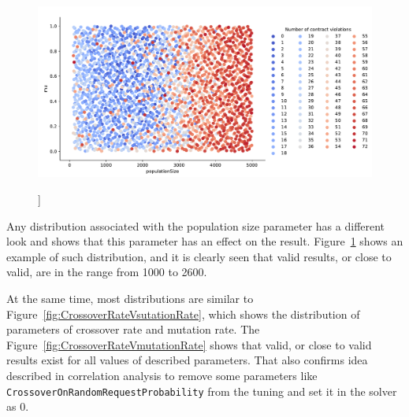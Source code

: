 \begin{figure}
	\centering
	\includegraphics[width=\textwidth]{images/populatioSizeVsMu.pdf}
	\caption[]]{}
	\label{fig:populatioSizeVsMu}
\end{figure}

Any distribution associated with the population size parameter has a different look and shows that this parameter has an effect on the result.
Figure~\ref{fig:populatioSizeVsMu} shows an example of such distribution, and it is clearly seen that valid results, or close to valid, are in the range from 1000 to 2600.

At the same time, most distributions are similar to Figure~\ref{fig:CrossoverRateVsutationRate}, which shows the distribution of parameters of crossover rate and mutation rate. 
The Figure~\ref{fig:CrossoverRateVmutationRate} shows that valid, or close to valid results exist for all values of described parameters. That also confirms idea described in correlation analysis to remove some parameters like \texttt{CrossoverOnRandomRequestProbability} from the tuning and set it in the solver as 0.

